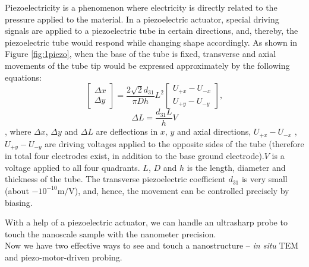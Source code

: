 Piezoelectricity is a phenomenon where electricity is directly related to the pressure applied to the material. In a piezoelectric actuator, special driving signals are applied to a piezoelectric tube in certain directions, and, thereby, the piezoelectric tube would respond while changing shape accordingly.\cite{okada2004piezoelectric,vishnevsky1977piezoelectric} As shown in Figure \ref{fig:1piezo}, when the base of the tube is fixed, transverse and axial movements of the tube tip would be expressed approximately by the following equations:
$$\begin{bmatrix}\Delta x\\ \Delta y\end{bmatrix}= \frac{2\sqrt{2}d_{31}}{\pi Dh}L^2\begin{bmatrix}U_{+x}-U_{-x}\\U_{+y}-U_{-y} \end{bmatrix},$$
$$\Delta L= \frac{d_{31}L}{h}V$$
, where $\Delta x$, $\Delta y$ and $\Delta L$ are deflections in $x$, $y$ and axial directions, $U_{+x}-U_{-x}$ , $U_{+y}-U_{-y}$ are driving voltages applied to the opposite sides of the tube (therefore in total four electrodes exist, in addition to the base ground electrode).$V$ is a voltage applied to all four quadrants. $L$, $D$ and $h$ is the length, diameter and thickness of the tube. The transverse piezoelectric coefficient $d_{31}$  is very small (about $-10^{-10} \mathrm{m/V}$), and, hence, the movement can be controlled precisely by biasing. 

With a help of a piezoelectric actuator, we can handle an ultrasharp probe to touch the nanoscale sample with the nanometer precision. 
\\
Now we have two effective ways to see and touch a nanostructure -- {\em in situ} TEM and piezo-motor-driven probing. 


